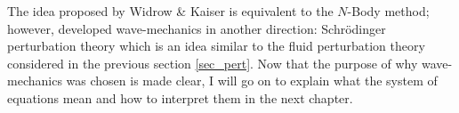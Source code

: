 The idea proposed by Widrow \& Kaiser is equivalent to the $N$-Body method; however, \citet{bib_sk} developed wave-mechanics in another direction: Schr\"odinger perturbation theory which is an idea similar to the fluid perturbation theory considered in the previous section \ref{sec_pert}. Now that the purpose of why wave-mechanics was chosen is made clear, I will go on to explain what the system of equations mean and how to interpret them in the next chapter.


